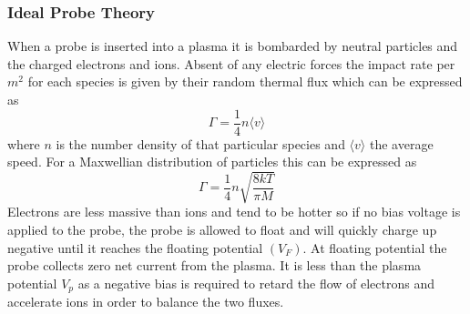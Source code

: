 \documentclass[12pt]{article}
\def\be{\begin{equation}}
\def\ee{\end{equation}}
\begin{document}
\subsubsection{Ideal Probe Theory}
When a probe is inserted into a plasma it is bombarded by neutral particles and the charged electrons and ions. Absent of any electric forces the impact rate per $m^2$ for each species is given by their random thermal flux which can be expressed as 
\be 
\Gamma = \frac{1}{4} n \langle{v}\rangle 
\label{eq:thermalmotion}
\ee
where $n$ is the number density of that particular species and $\langle{v}\rangle$ the average speed. For a Maxwellian distribution of particles this can be expressed as 
\be 
\Gamma =  \frac{1}{4} n \sqrt{\frac{8 k T}{\pi M}}
\ee
Electrons are less massive than ions and tend to be hotter so if no bias voltage is applied to the probe, the probe is allowed to float and will quickly charge up negative until it reaches the floating potential $(V_F)$. At floating potential the probe collects zero net current from the plasma. It is less than the plasma potential $V_{p}$ as a negative bias is required to retard the flow of electrons and accelerate ions in order to balance the two fluxes.
\end{document}
